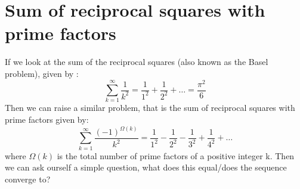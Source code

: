 \documentclass[12pt]{article}
\begin{document}
\section{Sum of reciprocal squares with prime factors}
If we look at the sum of the reciprocal squares (also known as the Basel problem), given by \cite{Basel_Problem}:
\begin{equation*}
  \sum^\infty_{k=1} \frac{1}{k^2} = \frac{1}{1^2}+\frac{1}{2^2}+\ldots = \frac{\pi^2}{6}
\end{equation*}
Then we can raise a similar problem, that is the sum of reciprocal squares with prime factors given by:
\begin{equation*}
  \sum^\infty_{k=1} \frac{(-1)^{\Omega(k)}}{k^2} = \frac{1}{1^2}-\frac{1}{2^2}-\frac{1}{3^2}+\frac{1}{4^2}+\ldots
\end{equation*}
where $\Omega(k)$ is the total number of prime factors of a positive integer k. Then we can ask ourself a simple question, what does this equal/does the sequence converge to?
\end{document}
